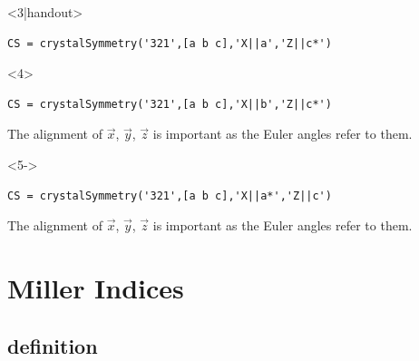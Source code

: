 \documentclass[compress]{beamer}
\begin{document}
\begin{frame}[fragile]
\begin{overlayarea}{\textwidth}{8cm}
\begin{columns}
\begin{column}{4.5cm}
\begin{tikzpicture}[x  = {(-0.5cm,-0.5cm)},
        y  = {(0.9659cm,-0.25882cm)},
        z  = {(0cm,1cm)},
        scale = 2]
\end{tikzpicture}

\end{column}
\end{columns}

\begin{onlyenv}<3|handout>
  \begin{lstlisting}[style=input]
CS = crystalSymmetry('321',[a b c],'X||a','Z||c*')
  \end{lstlisting}
\end{onlyenv}

\begin{onlyenv}<4>
  \begin{lstlisting}[style=input]
CS = crystalSymmetry('321',[a b c],'X||b','Z||c*')
\end{lstlisting}
\alert{The alignment of $\vec x$, $\vec y$, $\vec z$ is important as the Euler angles
refer to them.}
\end{onlyenv}

\begin{onlyenv}<5->
  \begin{lstlisting}[style=input]
CS = crystalSymmetry('321',[a b c],'X||a*','Z||c')
\end{lstlisting}
\alert{The alignment of $\vec x$, $\vec y$, $\vec z$ is important as the Euler angles
refer to them.}
\end{onlyenv}

\end{overlayarea}

\end{frame}

\section{Miller Indices}
\label{sec:miller-indices}

\subsection*{definition}
\label{sec:definition}
\end{document}
